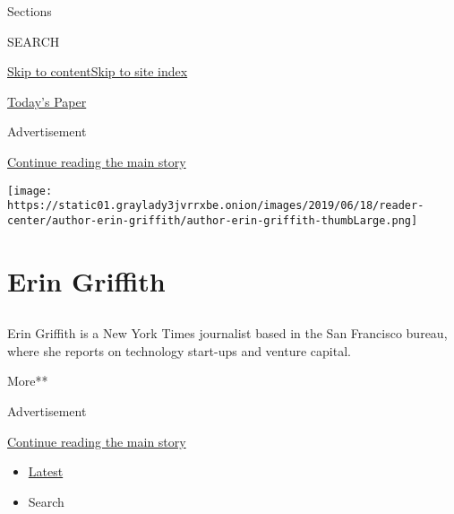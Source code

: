 Sections

SEARCH

\protect\hyperlink{site-content}{Skip to
content}\protect\hyperlink{site-index}{Skip to site index}

\href{https://myaccount.nytimes3xbfgragh.onion/auth/login?response_type=cookie\&client_id=vi}{}

\href{https://www.nytimes3xbfgragh.onion/section/todayspaper}{Today's
Paper}

Advertisement

\protect\hyperlink{after-top}{Continue reading the main story}

\texttt{[image: https://static01.graylady3jvrrxbe.onion/images/2019/06/18/reader-center/author-erin-griffith/author-erin-griffith-thumbLarge.png]}

\hypertarget{erin-griffith}{%
\section{Erin Griffith}\label{erin-griffith}}

\hypertarget{section}{%
\subsection{}\label{section}}

Erin Griffith is a New York Times journalist based in the San Francisco
bureau, where she reports on technology start-ups and venture capital.

More**

Advertisement

\protect\hyperlink{after-mid1}{Continue reading the main story}

\begin{itemize}
\tightlist
\item
  \protect\hyperlink{stream-panel}{Latest}
\item
  Search
\end{itemize}

